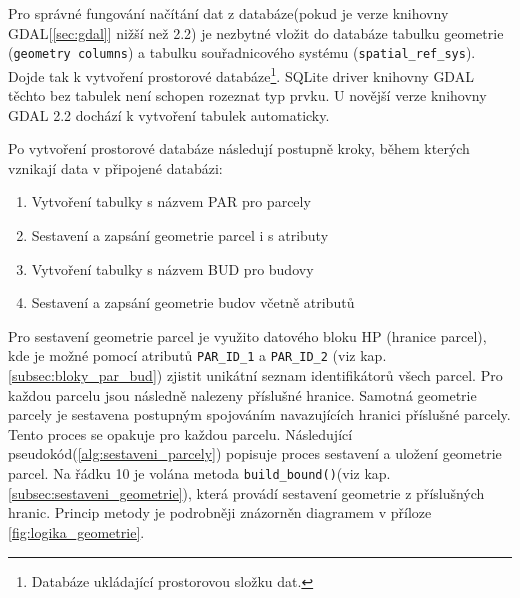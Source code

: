 Pro správné fungování načítání dat z databáze(pokud je verze knihovny GDAL[\ref{sec:gdal}] nižší než 2.2) je nezbytné vložit do databáze
tabulku geometrie (\verb|geometry columns|) a tabulku souřadnicového
systému (\verb|spatial_ref_sys|). Dojde tak k vytvoření prostorové
databáze\footnote{Databáze ukládající prostorovou složku dat.}. SQLite
driver knihovny GDAL těchto bez tabulek není schopen rozeznat typ prvku. U novější
verze knihovny GDAL 2.2 dochází k vytvoření tabulek automaticky.


Po vytvoření prostorové databáze následují postupně kroky, během
kterých vznikají data v připojené databázi:
\begin{enumerate}[leftmargin=50pt]
\item Vytvoření tabulky s názvem PAR pro parcely
\item Sestavení a zapsání geometrie parcel i s atributy
\item Vytvoření tabulky s názvem BUD pro budovy
\item Sestavení a zapsání geometrie budov včetně atributů
\end{enumerate}

Pro sestavení geometrie parcel je využito datového bloku HP (hranice
parcel), kde je možné pomocí atributů \verb|PAR_ID_1| a
\verb|PAR_ID_2| (viz kap. \ref{subsec:bloky_par_bud}) zjistit unikátní seznam
identifikátorů všech parcel. Pro každou parcelu jsou následně nalezeny
příslušné hranice. Samotná geometrie parcely je sestavena 
postupným spojováním navazujících hranici příslušné parcely. Tento proces se opakuje pro každou parcelu. Následující pseudokód(\ref{alg:sestaveni_parcely}) popisuje
proces sestavení a uložení geometrie parcel. Na řádku 10 je volána
metoda \verb|build_bound()|(viz kap. \ref{subsec:sestaveni_geometrie}), která
provádí sestavení geometrie z příslušných hranic. Princip metody je
podrobněji znázorněn diagramem v příloze \ref{fig:logika_geometrie}.

